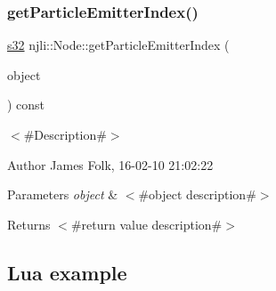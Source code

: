 \begin{DoxyCodeInclude}
\end{DoxyCodeInclude}
\mbox{\label{classnjli_1_1_node_a44cf22fb6896a874bfa7eb4eb3b2122e}} 
\subsubsection{\texorpdfstring{get\+Particle\+Emitter\+Index()}{getParticleEmitterIndex()}}
{\footnotesize\ttfamily \mbox{\hyperlink{_util_8h_aa62c75d314a0d1f37f79c4b73b2292e2}{s32}} njli\+::\+Node\+::get\+Particle\+Emitter\+Index (\begin{DoxyParamCaption}\item[{\mbox{\hyperlink{classnjli_1_1_particle_emitter}{Particle\+Emitter}} $\ast$}]{object }\end{DoxyParamCaption}) const}



$<$\#\+Description\#$>$ 

\begin{DoxyAuthor}{Author}
James Folk, 16-\/02-\/10 21\+:02\+:22
\end{DoxyAuthor}

\begin{DoxyParams}{Parameters}
{\em object} & $<$\#object description\#$>$\\
\hline
\end{DoxyParams}
\begin{DoxyReturn}{Returns}
$<$\#return value description\#$>$
\end{DoxyReturn}
\hypertarget{classnjli_1_1_steering_behavior_wander_ex1}{}\subsection{Lua example}\label{classnjli_1_1_steering_behavior_wander_ex1}

\begin{DoxyCodeInclude}
\end{DoxyCodeInclude}
\mbox{\label{classnjli_1_1_node_a10b57ef7a912c5b743def293a9aafeff}} 
